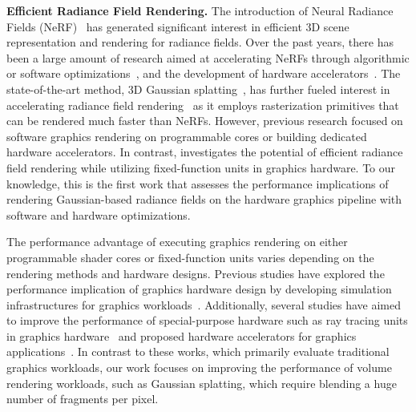 
\noindent \textbf{Efficient Radiance Field Rendering.}
%
The introduction of Neural Radiance Fields (NeRF)~\cite{mil:sri20} has
generated significant interest in efficient 3D scene representation and
rendering for radiance fields.
%
Over the past years, there has been a large amount of research aimed at
accelerating NeRFs through algorithmic or software
optimizations~\cite{mul:eva22,fri:yu22,che:fun23,sun:sun22}, and the
development of hardware
accelerators~\cite{lee:cho23,li:li23,son:wen23,mub:kan23,fen:liu24}.
%
The state-of-the-art method, 3D Gaussian splatting~\cite{ker:kop23}, has
further fueled interest in accelerating radiance field
rendering~\cite{rad:ste24,lee:lee24,nie:stu24,lee:rho24,ham:mel24} as it
employs rasterization primitives that can be rendered much faster than NeRFs.
%
However, previous research focused on software graphics rendering on
programmable cores or building dedicated hardware accelerators. In contrast,
\name{} investigates the potential of efficient radiance field rendering while
utilizing fixed-function units in graphics hardware.
%
To our knowledge, this is the first work that assesses the performance
implications of rendering Gaussian-based radiance fields on the hardware
graphics pipeline with software and hardware optimizations.

%
The performance advantage of executing graphics rendering on either
programmable shader cores or fixed-function units varies depending on the
rendering methods and hardware designs.
%
Previous studies have explored the performance implication of graphics hardware
design by developing simulation infrastructures for graphics
workloads~\cite{bar:gon06,gub:aam19,tin:sax23,arn:par13}.
%
Additionally, several studies have aimed to improve the performance of
special-purpose hardware such as ray tracing units in graphics
hardware~\cite{cho:now23,liu:cha21} and proposed hardware accelerators for
graphics applications~\cite{lu:hua17,ram:gri09}.
%
In contrast to these works, which primarily evaluate traditional graphics
workloads, our work focuses on improving the performance of volume rendering
workloads, such as Gaussian splatting, which require blending a huge number of
fragments per pixel.


